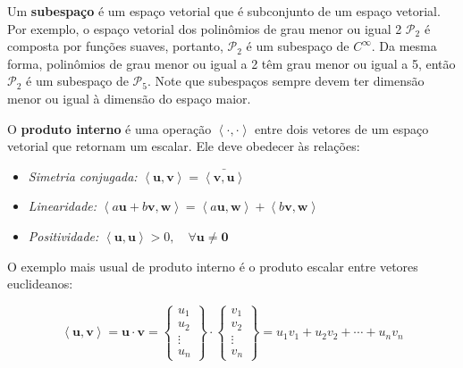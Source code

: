         Um \textbf{subespaço} é um espaço vetorial que é subconjunto de um espaço vetorial. Por exemplo, o espaço vetorial dos polinômios de grau menor ou igual 2 $\mathcal{P}_2$ é composta por funções suaves, portanto, $\mathcal{P}_2$ é um subespaço de $C^\infty$. Da mesma forma, polinômios de grau menor ou igual a 2 têm grau menor ou igual a 5, então $\mathcal{P}_2$ é um subespaço de $\mathcal{P}_5$. Note que subespaços sempre devem ter dimensão menor ou igual à dimensão do espaço maior.

        O \textbf{produto interno} é uma operação $\left\langle \cdot, \cdot \right\rangle $ entre dois vetores de um espaço vetorial que retornam um escalar. Ele deve obedecer às relações:

        \begin{itemize}
            \item \textit{Simetria conjugada:} $\left\langle \mathbf{u}, \mathbf{v} \right\rangle = \bar{\left\langle \mathbf{v}, \mathbf{u} \right\rangle}$
            \item \textit{Linearidade:} $\left\langle a\mathbf{u} + b\mathbf{v}, \mathbf{w} \right\rangle = \left\langle a\mathbf{u}, \mathbf{w} \right\rangle + \left\langle b\mathbf{v}, \mathbf{w} \right\rangle$
            \item \textit{Positividade:} $\left\langle \mathbf{u}, \mathbf{u} \right\rangle > 0 , \quad\forall \mathbf{u} \neq \mathbf{0}$
        \end{itemize}

        O exemplo mais usual de produto interno é o produto escalar entre vetores euclideanos:

        \begin{equation}
        \left\langle \mathbf{u}, \mathbf{v} \right\rangle  = 
        \mathbf{u} \cdot \mathbf{v} =
        \begin{Bmatrix}
            u_1\\
            u_2\\
            \vdots\\
            u_n
        \end{Bmatrix} \cdot
        \begin{Bmatrix}
            v_1\\
            v_2\\
            \vdots\\
            v_n
        \end{Bmatrix}
        =
        u_1 v_1 + u_2 v_2 + \cdots + u_n v_n
    \end{equation}

